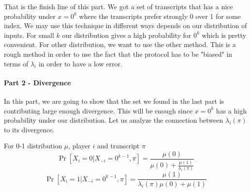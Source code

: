 That is the finish line of this part. We got a set of transcripts that has a nice probability under $x = 0^k$ where the transcripts prefer strongly 0 over 1 for some index. We may use this technique in different ways depends on our distribution of inputs. For small $k$ our distribution gives a high probability for $0^k$ which is pretty convenient. For other distribution, we want to use the other method. \newline
This is a rough method in order to use the fact that the protocol has to be "biased" in terms of $\lambda_i$ in order to have a low error. \newline
\paragraph{Part 2 - Divergence}
In this part, we are going to show that the set we found in the last part is contributing large enough divergence. This will be enough since $x = 0^k$ has a high probability under our distribution. \newline
Let us analyze the connection between $\lambda_i(\pi)$ to its divergence. \newline
\begin{lemma}
    For 0-1 distribution $\mu$, player $i$ and transcript $\pi$
    \begin{equation*}
        \Pr[X_i = 0 | X_{-i}=0^{k-1}, \pi] = \frac{\mu(0)}{\mu(0) + \frac{\mu(1)}{\lambda_i(\pi)}}
    \end{equation*}
    \begin{equation*}
        \Pr[X_i = 1 | X_{-i}=0^{k-1}, \pi] = \frac{\mu(1)}{\lambda_i(\pi)\mu(0) + \mu(1)}
    \end{equation*}
\end{lemma}
